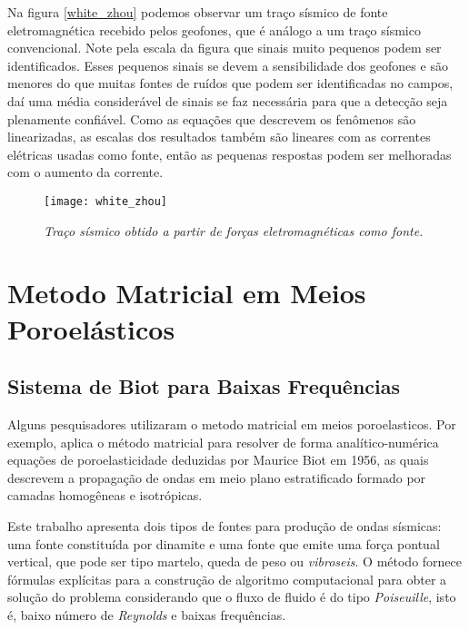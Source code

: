Na figura \ref{white_zhou} podemos observar um tra\c{c}o s\'ismico de fonte eletromagn\'etica recebido pelos geofones, que \'e an\'alogo a um tra\c{c}o s\'ismico convencional. Note pela escala da figura que sinais muito pequenos podem ser identificados. Esses pequenos sinais se devem a sensibilidade dos geofones e s\~ao menores do que muitas fontes de ru\'idos que podem ser identificadas no campos, da\'i uma m\'edia consider\'avel de sinais se faz necess\'aria para que a detec\c{c}\~ao seja plenamente confi\'avel. Como as equa\c{c}\~oes que descrevem os fen\^omenos s\~ao linearizadas, as escalas dos resultados tamb\'em s\~ao lineares com as correntes el\'etricas usadas como fonte, ent\~ao as pequenas respostas podem ser melhoradas com o aumento da corrente.
\begin{figure}
\centering
\texttt{[image: white\_zhou]}
\caption{\textit{Tra\c{c}o s\'ismico obtido a partir de for\c{c}as eletromagn\'eticas como fonte.}}
\label{fig.white_zhou}
\end{figure}  

\section{Metodo Matricial em Meios Poroel\'asticos}\label{sec.matricial_poroelast}


\subsection{Sistema de Biot para Baixas Frequ\^encias}\label{sec.biot}

Alguns pesquisadores utilizaram o metodo matricial em meios poroelasticos. Por exemplo,
\cite{Azeredo_2013} aplica o m\'etodo matricial para resolver de forma anal\'itico-num\'erica equa\c{c}\~oes de poroelasticidade deduzidas por Maurice Biot em 1956, as quais descrevem a propaga\c{c}\~ao de ondas em meio plano estratificado formado por camadas homog\^eneas e isotr\'opicas. 


Este trabalho apresenta dois tipos de fontes para produ\c{c}\~ao de ondas s\'ismicas:  uma fonte constitu\'ida por dinamite e uma fonte que emite uma for\c{c}a pontual vertical, que pode ser tipo martelo, queda de peso ou \textit{vibroseis}. O m\'etodo fornece f\'ormulas expl\'icitas para a constru\c{c}\~ao de algoritmo computacional  para obter a solu\c{c}\~ao do problema considerando que o fluxo de fluido \'e do tipo \textit{Poiseuille}, isto \'e, baixo n\'umero de \textit{Reynolds} e baixas frequ\^encias.

